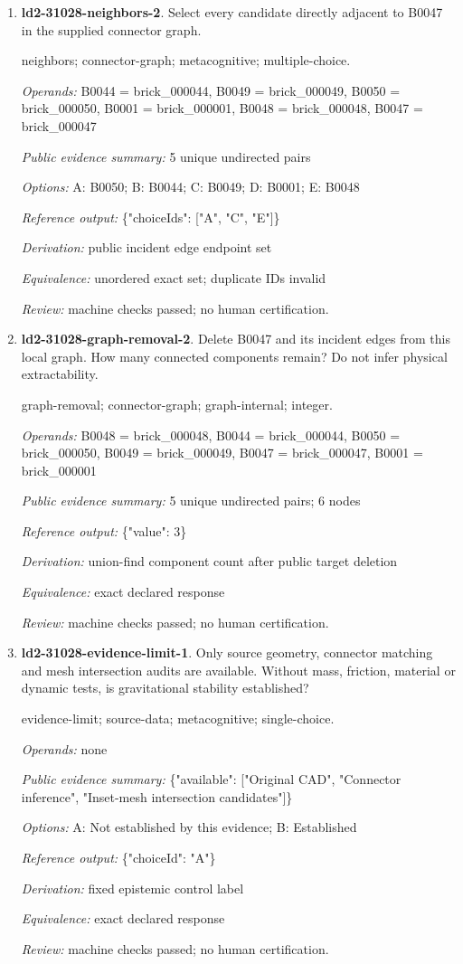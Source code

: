 \begin{enumerate}
\item \textbf{ld2-31028-neighbors-2}. Select every candidate directly adjacent to B0047 in the supplied connector graph.
\par{\small neighbors; connector-graph; metacognitive; multiple-choice.\par\textit{Operands:} B0044 = brick\_000044, B0049 = brick\_000049, B0050 = brick\_000050, B0001 = brick\_000001, B0048 = brick\_000048, B0047 = brick\_000047\par\textit{Public evidence summary:} 5 unique undirected pairs\par\textit{Options:} A: B0050; B: B0044; C: B0049; D: B0001; E: B0048\par\textit{Reference output:} \{"choiceIds": ["A", "C", "E"]\}\par\textit{Derivation:} public incident edge endpoint set\par\textit{Equivalence:} unordered exact set; duplicate IDs invalid\par\textit{Review:} machine checks passed; no human certification.}
\item \textbf{ld2-31028-graph-removal-2}. Delete B0047 and its incident edges from this local graph. How many connected components remain? Do not infer physical extractability.
\par{\small graph-removal; connector-graph; graph-internal; integer.\par\textit{Operands:} B0048 = brick\_000048, B0044 = brick\_000044, B0050 = brick\_000050, B0049 = brick\_000049, B0047 = brick\_000047, B0001 = brick\_000001\par\textit{Public evidence summary:} 5 unique undirected pairs; 6 nodes\par\textit{Reference output:} \{"value": 3\}\par\textit{Derivation:} union-find component count after public target deletion\par\textit{Equivalence:} exact declared response\par\textit{Review:} machine checks passed; no human certification.}
\item \textbf{ld2-31028-evidence-limit-1}. Only source geometry, connector matching and mesh intersection audits are available. Without mass, friction, material or dynamic tests, is gravitational stability established?
\par{\small evidence-limit; source-data; metacognitive; single-choice.\par\textit{Operands:} none\par\textit{Public evidence summary:} \{"available": ["Original CAD", "Connector inference", "Inset-mesh intersection candidates"]\}\par\textit{Options:} A: Not established by this evidence; B: Established\par\textit{Reference output:} \{"choiceId": "A"\}\par\textit{Derivation:} fixed epistemic control label\par\textit{Equivalence:} exact declared response\par\textit{Review:} machine checks passed; no human certification.}

\end{enumerate}
